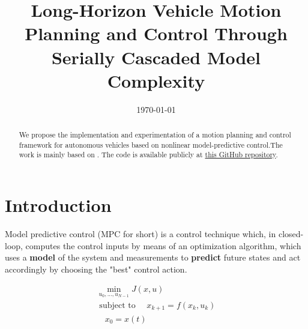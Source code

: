 \documentclass[a4paper, onecolumn, 11pt, twoside]{article}
\title{Long-Horizon Vehicle Motion Planning and Control Through Serially Cascaded Model Complexity}
\author{}
\date{\today}
\begin{document}
\maketitle

\begin{abstract}
    We propose the implementation and experimentation of a motion planning and
    control framework for autonomous vehicles based on nonlinear
    model-predictive control.The work is mainly based on \cite{paper}. The code
    is available publicly at
    \href{https://github.com/neverorfrog/vehicle-control}{this GitHub
    repository}. 
\end{abstract}


\section*{Introduction}

Model predictive control (MPC for short) is a control technique which, in
closed-loop, computes the control inputs by means of an optimization algorithm,
which uses a \textbf{model} of the system and measurements to \textbf{predict}
future states and act accordingly by choosing the "best" control action. 

\begin{equation}
\begin{aligned}
    \min_{u_0,...,u_{N-1}}{J(x,u)} \\
    \text{ subject to }
        \quad x_{k+1} = f(x_k,u_k) \\
        \quad x_0 = x(t)
        \quad 
\end{aligned}
\end{equation}
\end{document}
